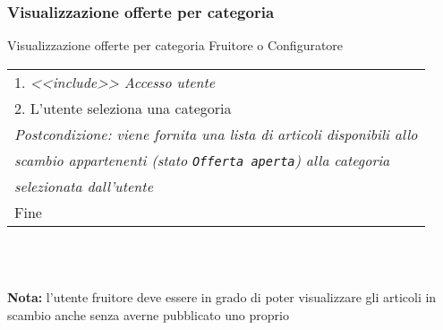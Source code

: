 \begin{minipage}{\textwidth}
    \subsubsection{Visualizzazione offerte per categoria}
    \usecase
        {Visualizzazione offerte per categoria}
        {
            Fruitore o Configuratore %
        }
        {
            \begin{tabular}{l}
                1. \textit{<<include>> Accesso utente}\\
                2. L'utente seleziona una categoria\\
                \textit{Postcondizione: viene fornita una lista di articoli disponibili allo}\\
                \textit{scambio appartenenti (stato \texttt{Offerta aperta}) alla categoria}\\
                \textit{selezionata dall'utente}\\
                Fine
            \end{tabular}\\

            \\


        }
        \vspace{0.5cm}
        \textbf{Nota:} l'utente fruitore deve essere in grado di poter visualizzare
        gli articoli in scambio anche senza averne pubblicato uno proprio
\end{minipage}